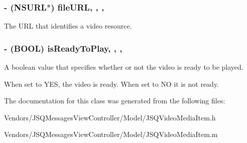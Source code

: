 \subsubsection[{file\+U\+R\+L}]{\setlength{\rightskip}{0pt plus 5cm}-\/ (N\+S\+U\+R\+L$\ast$) file\+U\+R\+L\hspace{0.3cm}{\ttfamily [read]}, {\ttfamily [write]}, {\ttfamily [nonatomic]}, {\ttfamily [strong]}}\label{interface_j_s_q_e_s_video_media_item_a1bb33ad4c3f4d362443b909a818ebf5a}
The U\+R\+L that identifies a video resource. \hypertarget{interface_j_s_q_e_s_video_media_item_a39bcd17dda91c3887c51eb9758011569}{}
\subsubsection[{is\+Ready\+To\+Play}]{\setlength{\rightskip}{0pt plus 5cm}-\/ (B\+O\+O\+L) is\+Ready\+To\+Play\hspace{0.3cm}{\ttfamily [read]}, {\ttfamily [write]}, {\ttfamily [nonatomic]}, {\ttfamily [assign]}}\label{interface_j_s_q_e_s_video_media_item_a39bcd17dda91c3887c51eb9758011569}
A boolean value that specifies whether or not the video is ready to be played.

When set to {\ttfamily Y\+E\+S}, the video is ready. When set to {\ttfamily N\+O} it is not ready. 

The documentation for this class was generated from the following files\+:\begin{DoxyCompactItemize}
\item 
Vendors/\+J\+S\+Q\+Messages\+View\+Controller/\+Model/J\+S\+Q\+Video\+Media\+Item.\+h\item 
Vendors/\+J\+S\+Q\+Messages\+View\+Controller/\+Model/J\+S\+Q\+Video\+Media\+Item.\+m\end{DoxyCompactItemize}
